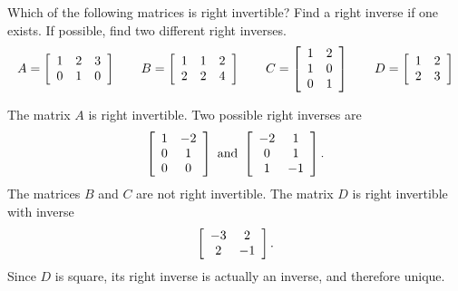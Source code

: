 \documentclass{ximera}
\begin{document}
\begin{example}
  Which of the following matrices is right invertible? Find a right
  inverse if one exists. If possible, find two different right
  inverses.
  \begin{equation*}
    A=\startmat{ccc}
      1 & 2 & 3 \\
      0 & 1 & 0 \\
    \stopmat
    \qquad
    B=\startmat{ccc}
      1 & 1 & 2 \\
      2 & 2 & 4 \\
    \stopmat
    \qquad
    C=\startmat{cc}
      1 & 2 \\
      1 & 0 \\
      0 & 1 \\
    \stopmat
    \qquad
    D=\startmat{cc}
      1 & 2 \\
      2 & 3 \\
    \stopmat
  \end{equation*}
  \begin{solution}
    The matrix $A$ is right invertible. Two possible right inverses
    are
    \begin{equation*}
      \startmat{cc}
        1 & -2 \\
        0 & 1 \\
        0 & 0 \\
      \stopmat
      \quad\mbox{and}\quad
      \startmat{cc}
        -2 & 1 \\
        0 & 1 \\
        1 & -1 \\
      \stopmat.
    \end{equation*}
    The matrices $B$ and $C$ are not right invertible. The matrix $D$
    is right invertible with inverse
    \begin{equation*}
      \startmat{cc}
        -3 & 2 \\
        2 & -1 \\
      \stopmat.
    \end{equation*}
    Since $D$ is square, its right inverse is actually an inverse, and
    therefore unique.
  \end{solution}
\end{example}
\end{document}
